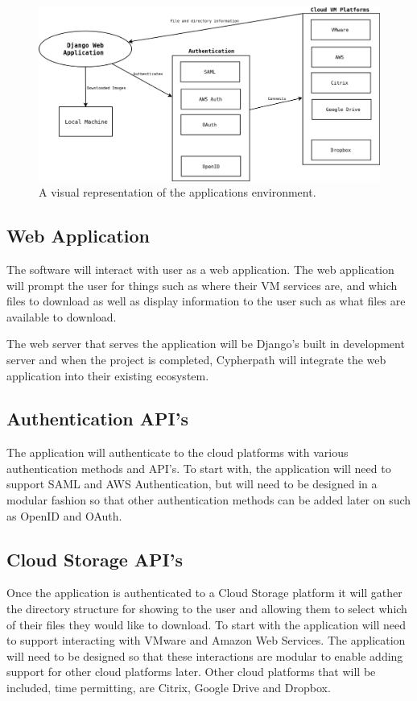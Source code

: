 \documentclass{article}
\begin{document}
    \begin{figure}[h]
    \includegraphics[scale=.4]{downloader_env}
        \caption{A visual representation of the applications environment.}
    \end{figure}


        \subsection{Web Application}
        The software will interact with user as a web application. The web application will prompt the user for things such as
        where their VM services are, and which files to download as well as display information to the user such as what files are available to download.

        The web server that serves the application will be Django's built in development server and when the project is completed, Cypherpath will integrate
        the web application into their existing ecosystem.

        
        \subsection{Authentication API's}
        The application will authenticate to the cloud platforms with various authentication methods and API's. To start with, the application will need to support
        SAML and AWS Authentication, but will need to be designed in a modular fashion so that other authentication methods can be added later on such as OpenID and OAuth.


        \subsection{Cloud Storage API's}
        Once the application is authenticated to a Cloud Storage platform it will gather the directory structure for showing to the user and allowing them to select
        which of their files they would like to download. To start with the application will need to support interacting with VMware and Amazon Web Services. The application will
        need to be designed so that these interactions are modular to enable adding support for other cloud platforms later. Other cloud platforms that will be included, time permitting,
        are Citrix, Google Drive and Dropbox.
\end{document}
